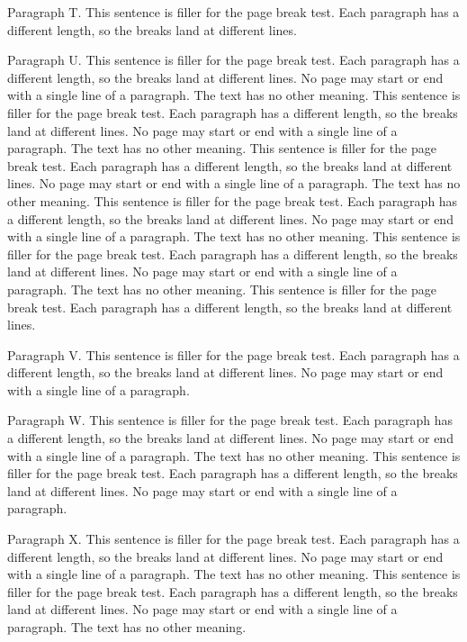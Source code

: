 Paragraph T. This sentence is filler for the page break test. Each paragraph
has a different length, so the breaks land at different lines.

Paragraph U. This sentence is filler for the page break test. Each paragraph
has a different length, so the breaks land at different lines. No page may
start or end with a single line of a paragraph. The text has no other meaning.
This sentence is filler for the page break test. Each paragraph has a
different length, so the breaks land at different lines. No page may start or
end with a single line of a paragraph. The text has no other meaning. This
sentence is filler for the page break test. Each paragraph has a different
length, so the breaks land at different lines. No page may start or end with a
single line of a paragraph. The text has no other meaning. This sentence is
filler for the page break test. Each paragraph has a different length, so the
breaks land at different lines. No page may start or end with a single line of
a paragraph. The text has no other meaning. This sentence is filler for the
page break test. Each paragraph has a different length, so the breaks land at
different lines. No page may start or end with a single line of a paragraph.
The text has no other meaning. This sentence is filler for the page break
test. Each paragraph has a different length, so the breaks land at different
lines.

Paragraph V. This sentence is filler for the page break test. Each paragraph
has a different length, so the breaks land at different lines. No page may
start or end with a single line of a paragraph.

Paragraph W. This sentence is filler for the page break test. Each paragraph
has a different length, so the breaks land at different lines. No page may
start or end with a single line of a paragraph. The text has no other meaning.
This sentence is filler for the page break test. Each paragraph has a
different length, so the breaks land at different lines. No page may start or
end with a single line of a paragraph.

Paragraph X. This sentence is filler for the page break test. Each paragraph
has a different length, so the breaks land at different lines. No page may
start or end with a single line of a paragraph. The text has no other meaning.
This sentence is filler for the page break test. Each paragraph has a
different length, so the breaks land at different lines. No page may start or
end with a single line of a paragraph. The text has no other meaning.

